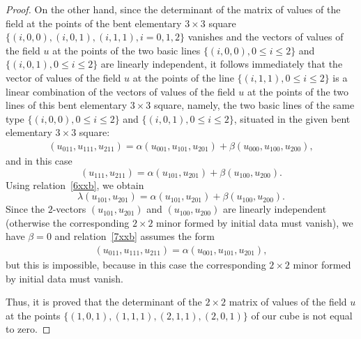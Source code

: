 \documentclass[pdftex]{sigma}
\begin{document}
\begin{proof}
On the other hand, since the determinant of the matrix of values of
the f\/ield at the points of the bent elementary $3 \times 3$ square
$\{(i, 0, 0), (i, 0, 1), (i, 1, 1), i = 0, 1, 2\}$ vanishes and the
vectors of values of the f\/ield $u$ at the points of the two basic
lines $\{(i, 0, 0), 0 \leq i \leq 2\}$ and $\{(i, 0, 1), 0 \leq i
\leq 2\}$ are linearly independent, it follows immediately that the
vector of values of the f\/ield $u$ at the points of the line $\{(i,
1, 1), 0 \leq i \leq 2\}$ is a linear combination of the vectors of
values of the f\/ield $u$ at the points of the two lines of this bent
elementary $3 \times 3$ square, namely, the two basic lines of the
same type $\{(i, 0, 0), 0 \leq i \leq 2\}$ and $\{(i, 0, 1), 0 \leq
i \leq 2\}$, situated in the given bent elementary $3 \times 3$
square:
\begin{gather} (u_{0 1 1}, u_{1 1 1}, u_{2 1 1}) = \alpha (u_{0 0 1}, u_{1 0
1}, u_{2 0 1}) + \beta (u_{0 0 0}, u_{1 0 0}, u_{2 0 0}),
\label{7xxb}
\end{gather}
and in this case \[ (u_{1 1 1}, u_{2 1 1}) =
\alpha (u_{1 0 1}, u_{2 0 1}) + \beta (u_{1 0 0}, u_{2 0 0}). \]
Using relation~\eqref{6xxb}, we obtain \[ \lambda (u_{1 0 1}, u_{2
0 1}) = \alpha (u_{1 0 1}, u_{2 0 1}) + \beta (u_{1 0 0}, u_{2 0
0}). \] Since the $2$-vectors $(u_{1 0 1}, u_{2 0 1})$ and $(u_{1 0
0}, u_{2 0 0})$ are linearly independent (otherwise the
corresponding $2 \times 2$ minor formed by initial data must
vanish), we have $\beta = 0$ and relation~\eqref{7xxb} assumes the
form \begin{gather*} (u_{0 1 1}, u_{1 1 1}, u_{2 1 1}) = \alpha (u_{0 0 1}, u_{1
0 1}, u_{2 0 1}), %
\end{gather*} but this is impossible, because
in this case the corresponding $2 \times 2$ minor formed by initial
data must vanish.


Thus, it is proved that the determinant of the $2 \times 2$ matrix
of values of the f\/ield $u$ at the points $\{(1, 0, 1), (1, 1, 1),
(2, 1, 1), (2, 0, 1)\}$ of our cube is not equal to zero.



\end{proof}
\end{document}
